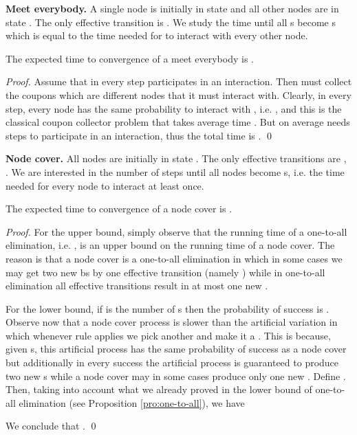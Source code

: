 \documentclass[oribibl, 11pt]{llncs}
\begin{document}
\noindent\textbf{Meet everybody.} A single node  is initially in state  and all other nodes are in state . The only effective transition is . We study the time until all s become s which is equal to the time needed for  to interact with every other node.

\begin{proposition} \label{pro:meet-ever}
The expected time to convergence of a meet everybody is .
\end{proposition}
\begin{proof}
Assume that in every step  participates in an interaction. Then  must collect the  coupons which are  different nodes that it must interact with. Clearly, in every step, every node has the same probability to interact with , i.e. , and this is the classical coupon collector problem that takes average time . But on average  needs  steps to participate in an interaction, thus the total time is . 
\qed
\end{proof} 

\noindent\textbf{Node cover.} All nodes are initially in state . The only effective transitions are , . We are interested in the number of steps until all nodes become s, i.e. the time needed for every node to interact at least once.

\begin{proposition} \label{pro:node-cover}
The expected time to convergence of a node cover is .
\end{proposition}
\begin{proof}
For the upper bound, simply observe that the running time of a one-to-all elimination, i.e. , is an upper bound on the running time of a node cover. The reason is that a node cover is a one-to-all elimination in which in some cases we may get two new bs by one effective transition (namely ) while in one-to-all elimination all effective transitions result in at most one new .

For the lower bound, if  is the number of s then the probability of success is . Observe now that a node cover process is slower than the artificial variation in which whenever rule  applies we pick another  and make it a . This is because, given  s, this artificial process has the same probability of success as a node cover but additionally in every success the artificial process is guaranteed to produce two new s while a node cover may in some cases produce only one new . Define . Then, taking into account what we already proved in the lower bound of one-to-all elimination (see Proposition \ref{pro:one-to-all}), we have

We conclude that . 
\qed
\end{proof}
\end{document}

